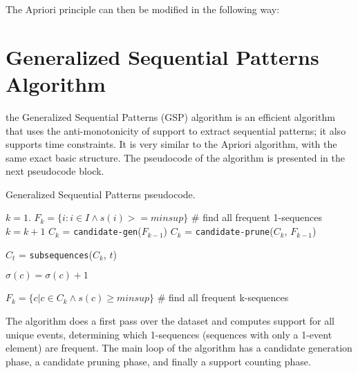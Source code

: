 The Apriori principle can then be modified in the following way:

\section{Generalized Sequential Patterns Algorithm}

the Generalized Sequential Patterns (GSP) algorithm is an efficient algorithm that uses the anti-monotonicity of support to extract sequential patterns; it also supports time constraints. It is very similar to the Apriori algorithm, with the same exact basic structure. The pseudocode of the algorithm is presented in the next pseudocode block.

\begin{algorithm}
\caption{Generalized Sequential Patterns pseudocode.}
\begin{algorithmic}[1]
    \State $k=1$.
    \State $F_k = \{ i : i \in I \land s(i) >= \textit{minsup} \}$ \# find all frequent 1-sequences
    \Repeat
        \State $k = k + 1$
        \State $C_k$ = \texttt{candidate-gen}($F_{k-1}$)
        \State $C_k$ = \texttt{candidate-prune}($C_k$, $F_{k-1}$)

            \State $C_t$ = \texttt{subsequences}($C_k$, $t$)

                \State $\sigma(c) = \sigma(c) + 1$
            \EndFor
        \EndFor

        \State $F_k = \{ c | c \in C_k \land s(c) \geq \textit{minsup} \}$ \# find all frequent k-sequences
\end{algorithmic}
\end{algorithm}
The algorithm does a first pass over the dataset and computes support for all unique events, determining which 1-sequences (sequences with only a 1-event element) are frequent. The main loop of the algorithm has a candidate generation phase, a candidate pruning phase, and finally a support counting phase.

